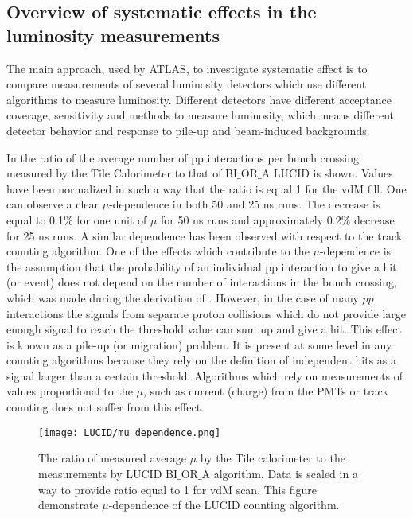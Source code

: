\subsection{Overview of systematic effects in the luminosity measurements}

The main approach, used by ATLAS, to investigate systematic effect is to compare measurements of several luminosity detectors which use different algorithms to measure luminosity.
Different detectors have different acceptance coverage, sensitivity and methods to measure luminosity, 
which means different detector behavior and response to pile-up and beam-induced backgrounds.

In  the ratio of the average number of pp interactions per bunch crossing measured by the Tile Calorimeter to that of BI$\_$OR$\_$A LUCID is shown.
Values have been normalized in such a way that the ratio is equal 1 for the vdM fill.
One can observe a clear $\mu$-dependence in both 50 and 25 ns runs. 
The decrease is equal to 0.1$\%$ for one unit of $\mu$ for 50 ns runs and approximately 0.2$\%$ decrease for 25 ns runs.
A similar dependence has been observed with respect to the track counting algorithm.
One of the effects which contribute to the $\mu$-dependence is the assumption that the probability of an individual pp interaction to give a hit (or event) does not depend on the number of interactions in the bunch crossing, which was made during the derivation of .
However, in the case of many $pp$ interactions the signals from separate proton collisions which do not provide large enough signal to reach the threshold value can sum up and give a hit. 
This effect is known as a pile-up (or migration) problem.
It is present at some level in any counting algorithms because they rely on the definition of independent hits as a signal larger than a certain threshold.
Algorithms which rely on measurements of values proportional to the $\mu$, such as current (charge) from the PMTs or track counting does not suffer from this effect.



\begin{figure}
\centering
\texttt{[image: LUCID/mu\_dependence.png]}
\caption{The ratio of measured average $\mu$ by the Tile calorimeter to the measurements by LUCID BI$\_$OR$\_$A algorithm. Data is scaled in a way to provide ratio equal to 1 for vdM scan.
This figure demonstrate $\mu$-dependence of the LUCID counting algorithm.}
\label{fig:mu_dependence}
\end{figure}

